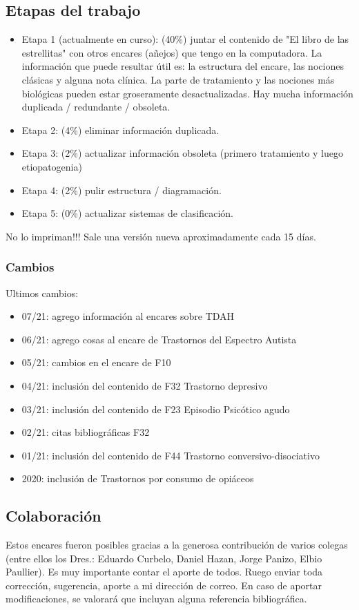 \documentclass[encares.tex]{subfiles}
\begin{document}
\subsection*{Etapas del trabajo}
\begin{itemize}
\item Etapa 1 (actualmente en curso): \faBatteryHalf (40\%) juntar el contenido de "El libro de las estrellitas" con otros encares (añejos) que tengo en la computadora. La información que puede resultar útil es: la estructura del encare, las nociones clásicas y alguna nota clínica. La parte de tratamiento y las nociones más biológicas pueden estar groseramente desactualizadas. Hay mucha información duplicada / redundante / obsoleta.
\item Etapa 2: \faBatteryEmpty (4\%) eliminar información duplicada.
\item Etapa 3: \faBatteryEmpty (2\%) actualizar información obsoleta (primero tratamiento y luego etiopatogenia)
\item Etapa 4: \faBatteryEmpty (2\%) pulir estructura / diagramación.
\item Etapa 5: \faBatteryEmpty (0\%) actualizar sistemas de clasificación.
\end{itemize}
\faStop No lo impriman!!! Sale una versión nueva aproximadamente cada 15 días.
\subsubsection*{Cambios}
Ultimos cambios:
\begin{itemize}
\item 07/21: agrego información al encares sobre TDAH
\item 06/21: agrego cosas al encare de Trastornos del Espectro Autista
\item 05/21: cambios en el encare de F10
\item 04/21: inclusión del contenido de F32 Trastorno depresivo
\item 03/21: inclusión del contenido de F23 Episodio Psicótico agudo
\item 02/21: citas bibliográficas F32
\item 01/21: inclusión del contenido de F44 Trastorno conversivo-disociativo
\item 2020: inclusión de Trastornos por consumo de opiáceos
\end{itemize}
\subsection*{Colaboración}
Estos encares fueron posibles gracias a la generosa contribución de varios colegas (entre ellos los Dres.: Eduardo Curbelo, Daniel Hazan, Jorge Panizo, Elbio Paullier). Es muy importante contar el aporte de todos. Ruego enviar toda corrección, sugerencia, aporte a mi dirección de correo. En caso de aportar modificaciones, se valorará que incluyan alguna referencia bibliográfica.
\end{document}
